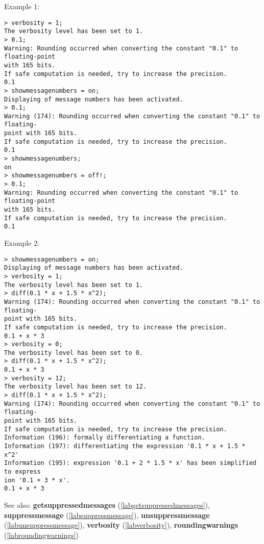 \noindent Example 1: 
\begin{center}\begin{minipage}{15cm}\begin{Verbatim}[frame=single]
> verbosity = 1;
The verbosity level has been set to 1.
> 0.1;
Warning: Rounding occurred when converting the constant "0.1" to floating-point 
with 165 bits.
If safe computation is needed, try to increase the precision.
0.1
> showmessagenumbers = on;
Displaying of message numbers has been activated.
> 0.1;
Warning (174): Rounding occurred when converting the constant "0.1" to floating-
point with 165 bits.
If safe computation is needed, try to increase the precision.
0.1
> showmessagenumbers;
on
> showmessagenumbers = off!;
> 0.1;
Warning: Rounding occurred when converting the constant "0.1" to floating-point 
with 165 bits.
If safe computation is needed, try to increase the precision.
0.1
\end{Verbatim}
\end{minipage}\end{center}
\noindent Example 2: 
\begin{center}\begin{minipage}{15cm}\begin{Verbatim}[frame=single]
> showmessagenumbers = on;
Displaying of message numbers has been activated.
> verbosity = 1;
The verbosity level has been set to 1.
> diff(0.1 * x + 1.5 * x^2);
Warning (174): Rounding occurred when converting the constant "0.1" to floating-
point with 165 bits.
If safe computation is needed, try to increase the precision.
0.1 + x * 3
> verbosity = 0;
The verbosity level has been set to 0.
> diff(0.1 * x + 1.5 * x^2);
0.1 + x * 3
> verbosity = 12;
The verbosity level has been set to 12.
> diff(0.1 * x + 1.5 * x^2);
Warning (174): Rounding occurred when converting the constant "0.1" to floating-
point with 165 bits.
If safe computation is needed, try to increase the precision.
Information (196): formally differentiating a function.
Information (197): differentiating the expression '0.1 * x + 1.5 * x^2'
Information (195): expression '0.1 + 2 * 1.5 * x' has been simplified to express
ion '0.1 + 3 * x'.
0.1 + x * 3
\end{Verbatim}
\end{minipage}\end{center}
See also: \textbf{getsuppressedmessages} (\ref{labgetsuppressedmessages}), \textbf{suppressmessage} (\ref{labsuppressmessage}), \textbf{unsuppressmessage} (\ref{labunsuppressmessage}), \textbf{verbosity} (\ref{labverbosity}), \textbf{roundingwarnings} (\ref{labroundingwarnings})
